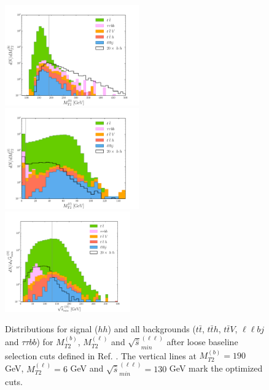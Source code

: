 %
\begin{figure}[t]
\centering
\includegraphics[width=5.77cm]{./section3/plots/Stacked_Log_MT2_b_Zero_BaseLineSel.pdf} \hspace*{-0.65cm}
\includegraphics[width=5.77cm]{./section3/plots/Stacked_Log_MT2_l_Zero_BaseLineSel.pdf}   \hspace*{-0.65cm}
\includegraphics[width=5.4cm]{./section3/plots/Stacked_Log_Smin_ll_Zero_BaseLineSel.pdf} 
\caption{\label{fig:newcuts} 
Distributions for signal ($hh$) and all backgrounds ($t \bar t$, $t\bar t h$, $t \bar t V$, $\ell\ell b j$ and $\tau\tau b b$) for $M_{T2}^{(b)}$, $M_{T2}^{(\ell)}$ and $\sqrt{\hat{s}}_{min}^{(\ell\ell)}$ after loose baseline selection cuts defined in Ref. \cite{Kim:2018cxf}. 
The vertical lines at $M_{T2}^{(b)} = 190$ GeV, $M_{T2}^{(\ell)}= 6$ GeV and $\sqrt{\hat{s}}_{min}^{(\ell\ell)}=130$ GeV mark the optimized cuts.}
\end{figure}
%
%
%
